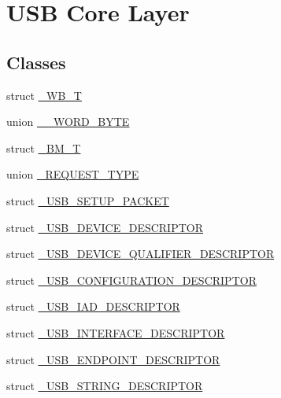 \hypertarget{group___u_s_b_d___core}{}\section{U\+SB Core Layer}
\label{group___u_s_b_d___core}
\subsection*{Classes}
\begin{DoxyCompactItemize}
\item 
struct \hyperlink{struct___w_b___t}{\+\_\+\+W\+B\+\_\+T}
\item 
union \hyperlink{union_____w_o_r_d___b_y_t_e}{\+\_\+\+\_\+\+W\+O\+R\+D\+\_\+\+B\+Y\+TE}
\item 
struct \hyperlink{struct___b_m___t}{\+\_\+\+B\+M\+\_\+T}
\item 
union \hyperlink{union___r_e_q_u_e_s_t___t_y_p_e}{\+\_\+\+R\+E\+Q\+U\+E\+S\+T\+\_\+\+T\+Y\+PE}
\item 
struct \hyperlink{struct___u_s_b___s_e_t_u_p___p_a_c_k_e_t}{\+\_\+\+U\+S\+B\+\_\+\+S\+E\+T\+U\+P\+\_\+\+P\+A\+C\+K\+ET}
\item 
struct \hyperlink{struct___u_s_b___d_e_v_i_c_e___d_e_s_c_r_i_p_t_o_r}{\+\_\+\+U\+S\+B\+\_\+\+D\+E\+V\+I\+C\+E\+\_\+\+D\+E\+S\+C\+R\+I\+P\+T\+OR}
\item 
struct \hyperlink{struct___u_s_b___d_e_v_i_c_e___q_u_a_l_i_f_i_e_r___d_e_s_c_r_i_p_t_o_r}{\+\_\+\+U\+S\+B\+\_\+\+D\+E\+V\+I\+C\+E\+\_\+\+Q\+U\+A\+L\+I\+F\+I\+E\+R\+\_\+\+D\+E\+S\+C\+R\+I\+P\+T\+OR}
\item 
struct \hyperlink{struct___u_s_b___c_o_n_f_i_g_u_r_a_t_i_o_n___d_e_s_c_r_i_p_t_o_r}{\+\_\+\+U\+S\+B\+\_\+\+C\+O\+N\+F\+I\+G\+U\+R\+A\+T\+I\+O\+N\+\_\+\+D\+E\+S\+C\+R\+I\+P\+T\+OR}
\item 
struct \hyperlink{struct___u_s_b___i_a_d___d_e_s_c_r_i_p_t_o_r}{\+\_\+\+U\+S\+B\+\_\+\+I\+A\+D\+\_\+\+D\+E\+S\+C\+R\+I\+P\+T\+OR}
\item 
struct \hyperlink{struct___u_s_b___i_n_t_e_r_f_a_c_e___d_e_s_c_r_i_p_t_o_r}{\+\_\+\+U\+S\+B\+\_\+\+I\+N\+T\+E\+R\+F\+A\+C\+E\+\_\+\+D\+E\+S\+C\+R\+I\+P\+T\+OR}
\item 
struct \hyperlink{struct___u_s_b___e_n_d_p_o_i_n_t___d_e_s_c_r_i_p_t_o_r}{\+\_\+\+U\+S\+B\+\_\+\+E\+N\+D\+P\+O\+I\+N\+T\+\_\+\+D\+E\+S\+C\+R\+I\+P\+T\+OR}
\item 
struct \hyperlink{struct___u_s_b___s_t_r_i_n_g___d_e_s_c_r_i_p_t_o_r}{\+\_\+\+U\+S\+B\+\_\+\+S\+T\+R\+I\+N\+G\+\_\+\+D\+E\+S\+C\+R\+I\+P\+T\+OR}

\end{DoxyCompactItemize}
